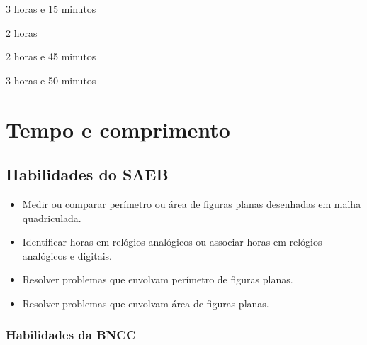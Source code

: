 \begin{escolha}
\begin{multicols}{2}

\item 3 horas e 15 minutos

\item 2 horas
\end{multicols}


\begin{multicols}{2}

\item 2 horas e 45 minutos

\item 3 horas e 50 minutos
\end{multicols}  
\end{escolha}

\chapter{Tempo e comprimento}
\enlargethispage{6\baselineskip}

\vspace*{-1.5cm}

\section*{Habilidades do SAEB}

\begin{itemize}
\item Medir ou comparar perímetro ou área de figuras planas desenhadas em malha quadriculada.

\item Identificar horas em relógios analógicos ou associar horas em relógios analógicos e digitais.

\item Resolver problemas que envolvam perímetro de figuras planas.

\item Resolver problemas que envolvam área de figuras planas.
\end{itemize}

\subsection{Habilidades da BNCC}

